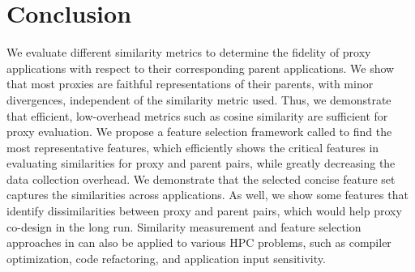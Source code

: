 \section{Conclusion}
\label{sec:conclusion}
We evaluate different similarity metrics to determine the fidelity of proxy applications with respect to their corresponding parent applications.
%
We show that most proxies are faithful representations of their parents, with minor divergences, independent of the similarity metric used.  Thus, we demonstrate that efficient, low-overhead metrics such as cosine similarity are sufficient for proxy evaluation.
%
We propose a feature selection framework called \us to find the most representative features, which efficiently shows the critical features in evaluating similarities for proxy and parent pairs, while greatly decreasing the data collection overhead. 
%
We demonstrate that the selected concise feature set captures the similarities across applications.
%
As well, we show some features that identify dissimilarities between proxy and parent pairs, which would help proxy co-design in the long run.
%
Similarity measurement and feature selection approaches in \us can also be applied to various HPC problems, such as compiler optimization, code refactoring, and application input sensitivity.
